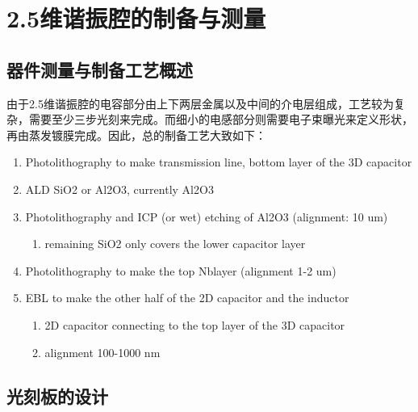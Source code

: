 \chapter{2.5维谐振腔的制备与测量} %
\label{cha:2_5维谐振腔的制备与测量}
	


        \section{器件测量与制备工艺概述} %
        \label{sec:制备工艺概述}

            由于2.5维谐振腔的电容部分由上下两层金属以及中间的介电层组成，工艺较为复杂，需要至少三步光刻来完成。而细小的电感部分则需要电子束曝光来定义形状，再由蒸发镀膜完成。因此，总的制备工艺大致如下：
            \begin{enumerate}
                \item Photolithography to make transmission line, bottom layer of the 3D capacitor
                \item ALD SiO2 or Al2O3, currently Al2O3
                \item Photolithography and ICP (or wet) etching of Al2O3 (alignment: 10 um)
                    \begin{enumerate}
                        \item remaining SiO2 only covers the lower capacitor layer
                    \end{enumerate}
                \item Photolithography to make the top Nblayer (alignment 1-2 um)
                \item EBL to make the other half of the 2D capacitor and the inductor
                    \begin{enumerate}
                        \item 2D capacitor connecting to the top layer of the 3D capacitor
                        \item alignment 100-1000 nm
                    \end{enumerate}
            \end{enumerate}
            

        \section{光刻板的设计} %
        \label{sec:光刻板的设计}

